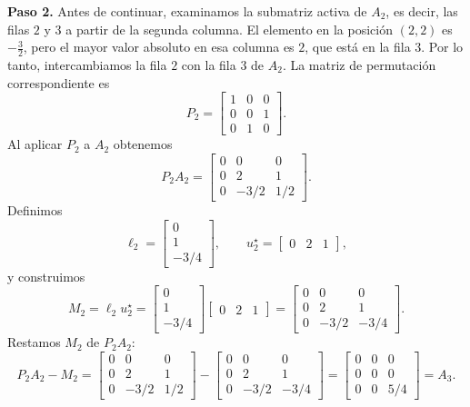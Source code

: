 \textbf{Paso 2.} Antes de continuar, examinamos la submatriz activa de $A_2$, es decir, las filas $2$ y $3$ a partir de la segunda columna. El elemento en la posición $(2,2)$ es $-\frac{3}{2}$, pero el mayor valor absoluto en esa columna es $2$, que está en la fila $3$. Por lo tanto, intercambiamos la fila $2$ con la fila $3$ de $A_2$. La matriz de permutación correspondiente es
\[
P_2 = \begin{bmatrix}
1 & 0 & 0 \\
0 & 0 & 1 \\
0 & 1 & 0
\end{bmatrix}.
\]
Al aplicar $P_2$ a $A_2$ obtenemos
\[
 P_2 A_2 =
\begin{bmatrix}
0 & 0 & 0 \\
0 & 2 & 1 \\
0 & -3/2 & 1/2
\end{bmatrix}.
\]
Definimos
\[
\ell_2 = \begin{bmatrix} 0 \\ 1 \\ -3/4 \end{bmatrix}, \qquad
u_2^\star = \begin{bmatrix} 0 & 2 & 1 \end{bmatrix},
\]
y construimos
\[
M_2 = \ell_2 u_2^\star =
\begin{bmatrix} 0 \\ 1 \\ -3/4 \end{bmatrix}
\begin{bmatrix} 0 & 2 & 1 \end{bmatrix}
=
\begin{bmatrix}
0 & 0 & 0 \\
0 & 2 & 1 \\
0 & -3/2 & -3/4
\end{bmatrix}.
\]
Restamos $M_2$ de $P_2A_2$:
\[
P_2A_2 - M_2 =
\begin{bmatrix}
0 & 0 & 0 \\
0 & 2 & 1 \\
0 & -3/2 & 1/2
\end{bmatrix}
-
\begin{bmatrix}
0 & 0 & 0 \\
0 & 2 & 1 \\
0 & -3/2 & -3/4
\end{bmatrix}
=
\begin{bmatrix}
0 & 0 & 0 \\
0 & 0 & 0 \\
0 & 0 & 5/4
\end{bmatrix}
= A_3.
\]
